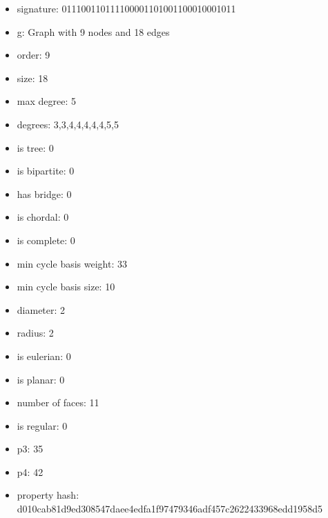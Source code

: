 \newpage
\begin{figure}
\end{figure}
\begin{itemize}
\item signature: 011100110111100001101001100010001011
\item g: Graph with 9 nodes and 18 edges
\item order: 9
\item size: 18
\item max degree: 5
\item degrees: 3,3,4,4,4,4,4,5,5
\item is tree: 0
\item is bipartite: 0
\item has bridge: 0
\item is chordal: 0
\item is complete: 0
\item min cycle basis weight: 33
\item min cycle basis size: 10
\item diameter: 2
\item radius: 2
\item is eulerian: 0
\item is planar: 0
\item number of faces: 11
\item is regular: 0
\item p3: 35
\item p4: 42
\item property hash: d010cab81d9ed308547daee4edfa1f97479346adf457c2622433968edd1958d5
\end{itemize}
